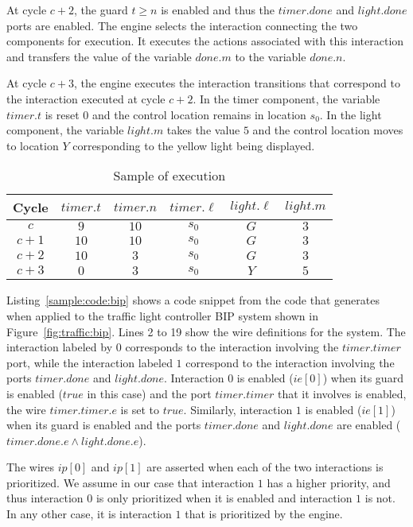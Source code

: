 At cycle $c+2$, the guard $t \geq n$ is enabled and thus the $timer.done$ and $light.done$ ports are enabled. 
The engine selects the interaction connecting the two components
for execution. It executes the actions associated with this interaction 
and transfers the value of the variable $done.m$ to the variable $done.n$.

At cycle $c+3$, the engine executes the interaction transitions that 
correspond to the interaction executed at cycle $c+2$. In the timer 
component, the variable $timer.t$ is reset $0$ and the control location 
remains in location $s_0$. In the light component, the variable 
$light.m$ takes the value $5$ and the control location moves to location 
$Y$ corresponding to the yellow light being displayed. 

\begin{table}[bt]
\centering
\caption{Sample of \biptool{} execution}
\begin{tabular}{|c|c|c|c|c|c|}
\hline
Cycle & $timer.t$ & $timer.n$ & $timer.\ell$ & $light.\ell$ & $light.m$ \\ 
\hline
$c$ & $9$ & $10$ & $s_0$ & $G$ & $3$ \\
		\hline
		$c+1$ & $10$ & $10$ & $s_0$ & $G$ & $3$ \\
			\hline
			$c+2$ & $10$ & $3$ & $s_0$ & $G$ & $3$ \\
				\hline
	 $c+3$ & $0$ & $3$ & $s_0$ & $Y$ & $5$ \\
	 \hline
\end{tabular}
\label{tb:bip:exec}
\end{table}

Listing~\ref{sample:code:bip} shows a code snippet from the code that \biptool{} generates
when applied to the traffic light controller BIP system shown in Figure~\ref{fig:traffic:bip}.
Lines 2 to 19 show the wire definitions for the system. The interaction 
labeled by $0$ corresponds to the interaction involving the $timer.timer$
port, while the interaction labeled $1$ correspond to the interaction 
involving the ports $timer.done$ and $light.done$. 
Interaction $0$ is enabled ($ie[0]$) when its guard is enabled ($true$ 
in this case) and the port $timer.timer$ that it involves is enabled, 
\ie{} the wire $timer.timer.e$ is set to $true$. 
Similarly, interaction $1$ is enabled ($ie[1]$) when its guard is
enabled and the ports $timer.done$ and $light.done$ are enabled 
($timer.done.e \land light.done.e$).

The wires $ip[0]$ and $ip[1]$ are asserted when each of the two interactions 
is prioritized. We assume in our case that interaction $1$ has a higher
priority, and thus interaction $0$ is only prioritized when it is enabled
and interaction $1$ is not. In any other case, it is interaction $1$ that
is prioritized by the engine. 

